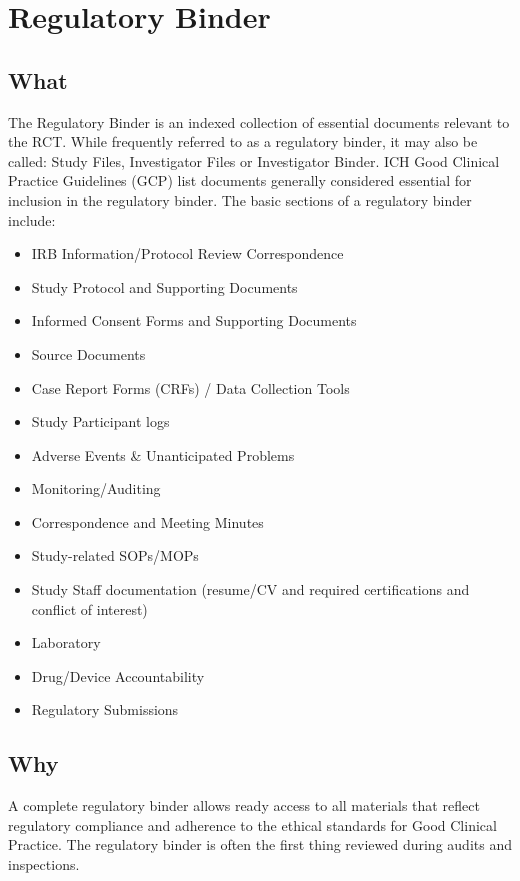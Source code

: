 \documentclass[]{book}
\providecommand{\tightlist}{%
  \setlength{\itemsep}{0pt}\setlength{\parskip}{0pt}}
\begin{document}
\section{Regulatory Binder}\label{regulatory-binder}

\subsection{What}\label{what-16}

The Regulatory Binder is an indexed collection of essential documents
relevant to the RCT. While frequently referred to as a regulatory
binder, it may also be called: Study Files, Investigator Files or
Investigator Binder. ICH Good Clinical Practice Guidelines (GCP) list
documents generally considered essential for inclusion in the regulatory
binder. The basic sections of a regulatory binder include:

\begin{itemize}
\tightlist
\item
  IRB Information/Protocol Review Correspondence
\item
  Study Protocol and Supporting Documents
\item
  Informed Consent Forms and Supporting Documents
\item
  Source Documents
\item
  Case Report Forms (CRFs) / Data Collection Tools
\item
  Study Participant logs
\item
  Adverse Events \& Unanticipated Problems
\item
  Monitoring/Auditing
\item
  Correspondence and Meeting Minutes
\item
  Study-related SOPs/MOPs
\item
  Study Staff documentation (resume/CV and required certifications and
  conflict of interest)
\item
  Laboratory
\item
  Drug/Device Accountability
\item
  Regulatory Submissions
\end{itemize}

\subsection{Why}\label{why-16}

A complete regulatory binder allows ready access to all materials that
reflect regulatory compliance and adherence to the ethical standards for
Good Clinical Practice. The regulatory binder is often the first thing
reviewed during audits and inspections.
\end{document}

